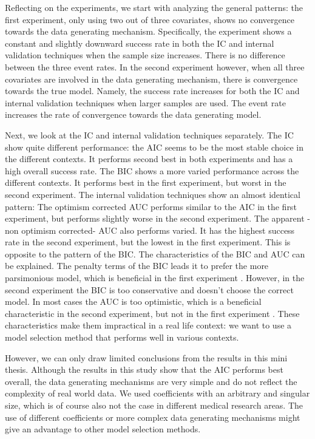 \documentclass[AMA,STIX1COL]{WileyNJD-v5}
\begin{document}
Reflecting on the experiments, we start with analyzing the general
patterns: the first experiment, only using two out of three covariates,
shows no convergence towards the data generating mechanism.
Specifically, the experiment shows a constant and slightly downward
success rate in both the IC and internal validation techniques when the
sample size increases. There is no difference between the three event
rates. In the second experiment however, when all three covariates are
involved in the data generating mechanism, there is convergence towards
the true model. Namely, the success rate increases for both the IC and
internal validation techniques when larger samples are used. The event
rate increases the rate of convergence towards the data generating
model.

Next, we look at the IC and internal validation techniques separately.
The IC show quite different performance: the AIC seems to be the most
stable choice in the different contexts. It performs second best in both
experiments and has a high overall success rate. The BIC shows a more
varied performance across the different contexts. It performs best in
the first experiment, but worst in the second experiment. The internal
validation techniques show an almost identical pattern: The optimism
corrected AUC performs similar to the AIC in the first experiment, but
performs slightly worse in the second experiment. The apparent -non
optimism corrected- AUC also performs varied. It has the highest success
rate in the second experiment, but the lowest in the first experiment.
This is opposite to the pattern of the BIC. The characteristics of the
BIC and AUC can be explained. The penalty terms of the BIC leads it to
prefer the more parsimonious model, which is beneficial in the first
experiment \citep{neathBayesianInformationCriterion2012}. However, in
the second experiment the BIC is too conservative and doesn't choose the
correct model. In most cases the AUC is too optimistic, which is a
beneficial characteristic in the second experiment, but not in the first
experiment \citep{ledellComputationallyEfficientConfidence2015}. These
characteristics make them impractical in a real life context: we want to
use a model selection method that performs well in various contexts.

However, we can only draw limited conclusions from the results in this
mini thesis. Although the results in this study show that the AIC
performs best overall, the data generating mechanisms are very simple
and do not reflect the complexity of real world data. We used
coefficients with an arbitrary and singular size, which is of course
also not the case in different medical research areas. The use of
different coefficients or more complex data generating mechanisms might
give an advantage to other model selection methods.
\end{document}
